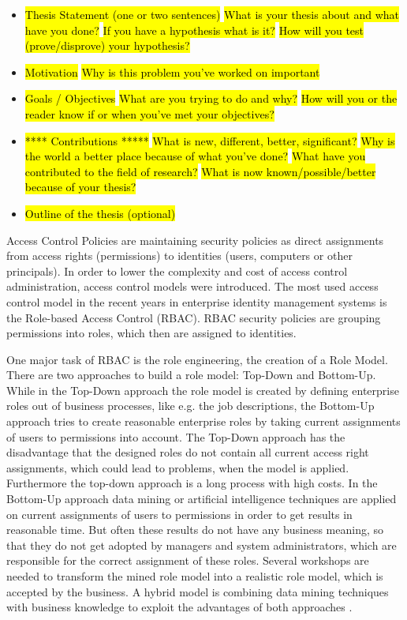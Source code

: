     \begin{itemize}
        \item \hl{Thesis Statement (one or two sentences)}
            \subitem \hl{What is your thesis about and what have you done?}
            \subitem \hl{If you have a hypothesis what is it?}
            \subitem \hl{How will you test (prove/disprove) your hypothesis?}
        \item \hl{Motivation}
            \subitem \hl{Why is this problem you've worked on important}
        \item \hl{Goals / Objectives}
            \subitem \hl{What are you trying to do and why?}
            \subitem \hl{How will you or the reader know if or when you've met your objectives?}
        \item \hl{**** Contributions *****}
            \subitem \hl{What is new, different, better, significant?}
            \subitem \hl{Why is the world a better place because of what you've done?}
            \subitem \hl{What have you contributed to the field of research?}
            \subitem \hl{What is now known/possible/better because of your thesis?}
        \item \hl{Outline of the thesis (optional)}
    \end{itemize}
\fi

Access Control Policies are maintaining security policies as direct assignments from access rights (permissions) to identities (users, computers or other principals). In order to lower the complexity and cost of access control administration, access control models were introduced. The most used access control model in the recent years in enterprise identity management systems is the Role-based Access Control (RBAC)\cite{Kunz}. RBAC security policies are grouping permissions into roles, which then are assigned to identities.

One major task of RBAC is the role engineering, the creation of a Role Model. There are two approaches to build a role model: Top-Down and Bottom-Up. While in the Top-Down approach the role model is created by defining enterprise roles out of business processes, like e.g. the job descriptions, the Bottom-Up approach tries to create reasonable enterprise roles by taking current assignments of users to permissions into account. The Top-Down approach has the disadvantage that the designed roles do not contain all current access right assignments, which could lead to problems, when the model is applied. Furthermore the top-down approach is a long process with high costs. In the Bottom-Up approach data mining or artificial intelligence techniques are applied on current assignments of users to permissions in order to get results in reasonable time. But often these results do not have any business meaning, so that they do not get adopted by managers and system administrators, which are responsible for the correct assignment of these roles. Several workshops are needed to transform the mined role model into a realistic role model, which is accepted by the business. A hybrid model is combining data mining techniques with business knowledge to exploit the advantages of both approaches\cite{Frank} \cite{Xu} \cite{Coyne:2011}.

